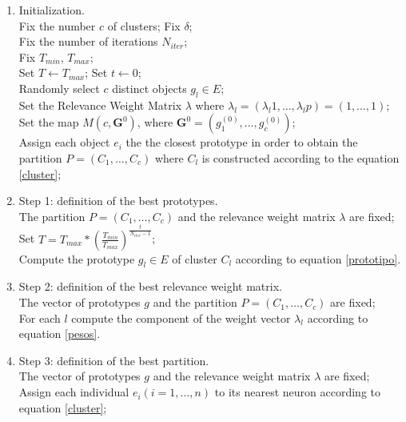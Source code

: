 \documentclass[10pt, conference, compsocconf]{IEEEtran}
\begin{document}
\begin{enumerate}
\item Initialization.\\
Fix the number $c$ of clusters; Fix $\delta$;\\
Fix the number of iterations $N_{iter}$;\\
Fix $T_{min}$, $T_{max}$;\\
Set $T \leftarrow T_{max}$; Set $t \leftarrow 0$;\\
Randomly select $c$ distinct objects $g_l \in E$;\\
Set the Relevance Weight Matrix $\lambda$ where $\lambda_l = (\lambda_l1, \dots, \lambda_lp) = (1, \dots, 1)$;\\
Set the map $M(c,\textbf{G}^0)$, where $\textbf{G}^0 = (g_1^{(0)},\dots,g_c^{(0)})$;\\
Assign each object $e_i$ the the closest prototype in order to obtain the partition $P = (C_1,\dots, C_c)$ where $C_l$ is constructed according to the equation \ref{cluster};\\

\item Step 1: definition of the best prototypes.\\
The partition $P = (C_1,\dots, C_c)$ and the relevance weight matrix $\lambda$ are fixed;\\
Set $T = T_{max}\ast (\frac{T_{min}}{T_{max}})^\frac{t}{N_{iter}-1}$;\\
Compute the prototype $g_l \in E$ of cluster $C_l$ according to equation \ref{prototipo}.\\

\item Step 2: definition of the best relevance weight matrix.\\
The vector of prototypes $g$ and the partition $P = (C_1,\dots, C_c)$ are fixed;\\
For each $l$ compute the component of the weight vector $\lambda_l$ according to equation \ref{pesos}.\\

\item Step 3: definition of the best partition.\\
The vector of prototypes $g$ and the relevance weight matrix $\lambda$ are fixed;\\
Assign each individual $e_i (i = 1, \dots, n)$ to its nearest neuron according to equation \ref{cluster};\\

%


\end{enumerate}
\end{document}
